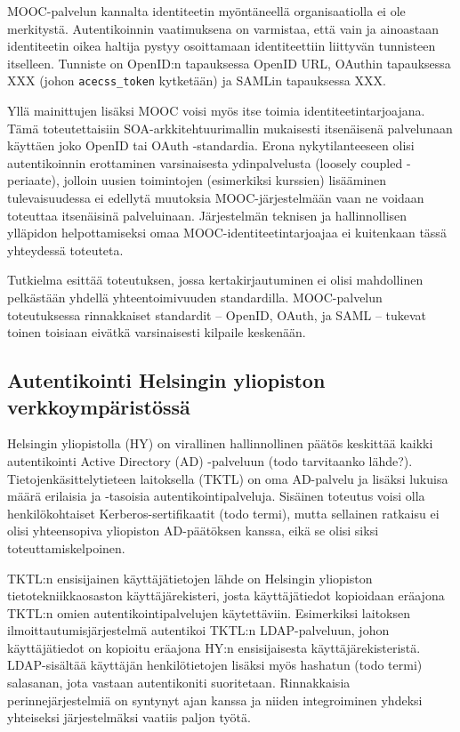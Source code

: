 \documentclass[finnish,gradu]{tktltiki}
\begin{document}
  MOOC-palvelun kannalta identiteetin myöntäneellä organisaatiolla ei ole merkitystä. Autentikoinnin vaatimuksena on varmistaa, että vain ja ainoastaan identiteetin oikea haltija pystyy osoittamaan identiteettiin liittyvän tunnisteen itselleen. Tunniste on OpenID:n tapauksessa OpenID URL, OAuthin tapauksessa XXX (johon \verb#acecss_token# kytketään) ja SAMLin tapauksessa XXX.

  Yllä mainittujen lisäksi MOOC voisi myös itse toimia identiteetintarjoajana. Tämä toteutettaisiin SOA-arkkitehtuurimallin mukaisesti itsenäisenä palvelunaan käyttäen joko OpenID tai OAuth -standardia. Erona nykytilanteeseen olisi autentikoinnin erottaminen varsinaisesta ydinpalvelusta (loosely coupled -periaate), jolloin uusien toimintojen (esimerkiksi kurssien) lisääminen tulevaisuudessa ei edellytä muutoksia MOOC-järjestelmään vaan ne voidaan toteuttaa itsenäisinä palveluinaan. Järjestelmän teknisen ja hallinnollisen ylläpidon helpottamiseksi omaa MOOC-identiteetintarjoajaa ei kuitenkaan tässä yhteydessä toteuteta.

  Tutkielma esittää toteutuksen, jossa kertakirjautuminen ei olisi mahdollinen pelkästään yhdellä yhteentoimivuuden standardilla. MOOC-palvelun toteutuksessa rinnakkaiset standardit -- OpenID, OAuth, ja SAML -- tukevat toinen toisiaan eivätkä varsinaisesti kilpaile keskenään.




  \subsection{Autentikointi Helsingin yliopiston verkkoympäristössä} %
  \label{sub:autentikointi_helsingin_yliopiston_verkkoympäristössä}

  Helsingin yliopistolla (HY) on virallinen hallinnollinen päätös keskittää kaikki autentikointi Active Directory (AD) -palveluun (todo tarvitaanko lähde?).
  Tietojenkäsittelytieteen laitoksella (TKTL) on oma AD-palvelu ja lisäksi lukuisa määrä erilaisia ja -tasoisia autentikointipalveluja.
  Sisäinen toteutus voisi olla henkilökohtaiset Kerberos-sertifikaatit (todo termi), mutta sellainen ratkaisu ei olisi yhteensopiva yliopiston AD-päätöksen kanssa, eikä se olisi siksi toteuttamiskelpoinen.

  TKTL:n ensisijainen käyttäjätietojen lähde on Helsingin yliopiston tietotekniikkaosaston käyttäjärekisteri, josta käyttäjätiedot kopioidaan eräajona TKTL:n omien autentikointipalvelujen käytettäviin. Esimerkiksi laitoksen ilmoittautumisjärjestelmä autentikoi TKTL:n LDAP-palveluun, johon käyttäjätiedot on kopioitu eräajona HY:n ensisijaisesta käyttäjärekisteristä. LDAP-sisältää käyttäjän henkilötietojen lisäksi myös hashatun (todo termi) salasanan, jota vastaan autentikoniti suoritetaan. Rinnakkaisia perinnejärjestelmiä on syntynyt ajan kanssa ja niiden integroiminen yhdeksi yhteiseksi järjestelmäksi vaatiis paljon työtä.
\end{document}
